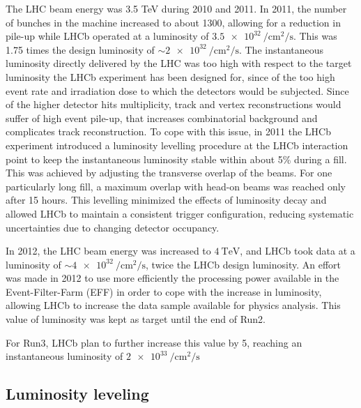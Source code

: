 The LHC beam energy was 3.5 TeV during 2010 and 2011. In 2011, the number of bunches in the machine increased to about 1300, allowing for a reduction in pile-up while LHCb operated at a luminosity of $\SI{3.5e32}{\per\centi\meter\squared\per\second}$. This was 1.75 times the design luminosity of $\sim \SI{2e32}{\per\centi\meter\squared\per\second}$. The instantaneous luminosity directly delivered by the LHC was too high with respect to the target luminosity the LHCb experiment has been designed for, since of the too high event rate and irradiation dose to which the detectors would be subjected. Since of the higher detector hits multiplicity, track and vertex reconstructions would suffer of high event pile-up, that increases combinatorial background and complicates track reconstruction.
To cope with this issue, in 2011 the LHCb experiment introduced a luminosity levelling procedure at the LHCb interaction point to keep the instantaneous luminosity stable within about 5\% during a fill. This was achieved by adjusting the transverse overlap of the beams. For one particularly long fill, a maximum overlap with head-on beams was reached only after 15 hours. This levelling minimized the effects of luminosity decay and allowed LHCb to maintain a consistent trigger configuration, reducing systematic uncertainties due to changing detector occupancy.

In 2012, the LHC beam energy was increased to $\SI{4}{\tera\eV}$, and LHCb took data at a luminosity of $\sim \SI{4e32}{\per\centi\meter\squared\per\second}$, twice the LHCb design luminosity. An effort was made in 2012 to use more efficiently the processing power available in the Event-Filter-Farm (EFF) in order to cope with the increase in luminosity, allowing LHCb to increase the data sample available for physics analysis. This value of luminosity was kept as target until the end of Run2. 


For Run3, LHCb plan to further increase this value by 5, reaching an instantaneous luminosity of $\SI{2e33}{\per\centi\meter\squared\per\second}$

\subsection{Luminosity leveling}

